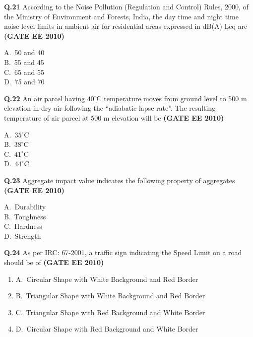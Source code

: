 \documentclass[journal,12pt,onecolumn]{exam}
\theoremstyle{remark}
\begin{document}
\noindent\textbf{Q.21} According to the Noise Pollution (Regulation and Control) Rules, 2000, of the Ministry of Environment and Forests, India, the day time and night time noise level limits in ambient air for residential areas expressed in dB(A) Leq are
\hfill\textbf{(GATE EE 2010)}
\begin{multicols}{4}
A.\ 50 and 40 \\
B.\ 55 and 45 \\
C.\ 65 and 55 \\
D.\ 75 and 70
\end{multicols}

\setlength{\parindent}{0pt}
\setlength{\parskip}{0.5cm}


\noindent\textbf{Q.22} An air parcel having $40^\circ\mathrm{C}$ temperature moves from ground level to 500 m elevation in dry air following the ``adiabatic lapse rate''. The resulting temperature of air parcel at 500 m elevation will be
\hfill\textbf{(GATE EE 2010)}
\begin{multicols}{4}
A.\ $35^\circ\mathrm{C}$ \\
B.\ $38^\circ\mathrm{C}$ \\
C.\ $41^\circ\mathrm{C}$ \\
D.\ $44^\circ\mathrm{C}$
\end{multicols}

\noindent\textbf{Q.23} Aggregate impact value indicates the following property of aggregates
\hfill\textbf{(GATE EE 2010)}
\begin{multicols}{4}
A.\ Durability \\
B.\ Toughness \\
C.\ Hardness \\
D.\ Strength
\end{multicols}

\noindent\textbf{Q.24} As per IRC: 67-2001, a traffic sign indicating the Speed Limit on a road should be of               
\hfill\textbf{(GATE EE 2010)}
\begin{enumerate}[label=]
    
\item A.\ Circular Shape with White Background and Red Border \\
\item B.\ Triangular Shape with White Background and Red Border \\
\item C.\ Triangular Shape with Red Background and White Border \\
\item D.\ Circular Shape with Red Background and White Border
\end{enumerate}
\end{document}
